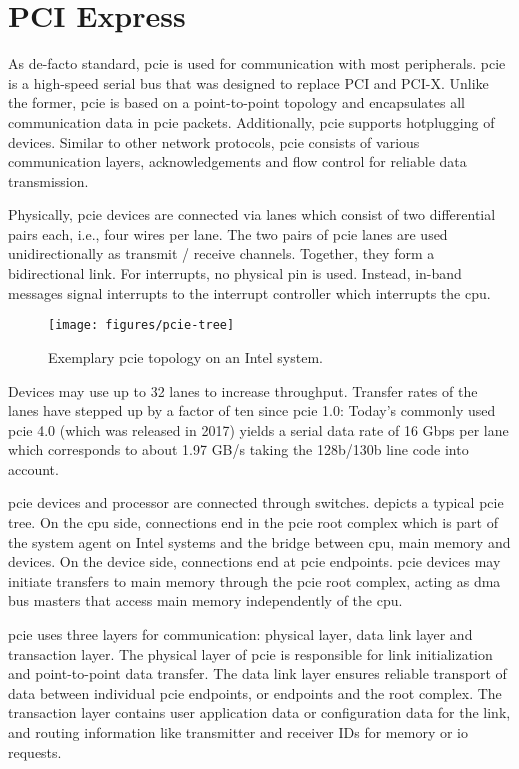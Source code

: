 \section{PCI Express}
\label{sec:pcie}

As de-facto standard, \acf{pcie} is used for communication with most
peripherals. \ac{pcie} is a high-speed serial bus that was designed to replace
PCI and PCI-X. Unlike the former, \ac{pcie} is based on a point-to-point
topology and encapsulates all communication data in \ac{pcie} packets.
Additionally, \ac{pcie} supports hotplugging of devices. Similar to other
network protocols, \ac{pcie} consists of various communication layers,
acknowledgements and flow control for reliable data transmission.

Physically, \ac{pcie} devices are connected via lanes which consist of two
differential pairs each, i.e., four wires per lane. The two pairs of \ac{pcie}
lanes are used unidirectionally as transmit / receive channels. Together, they
form a bidirectional link. For interrupts, no physical pin is used. Instead,
in-band messages signal interrupts to the interrupt controller which interrupts
the \ac{cpu}.

\begin{figure}
    \centering
    \texttt{[image: figures/pcie-tree]}
    \caption{Exemplary \acs{pcie} topology on an Intel system.}
    \label{fig:pcie-topology}
\end{figure}

Devices may use up to 32 lanes to increase throughput. Transfer rates of the
lanes have stepped up by a factor of ten since \ac{pcie} 1.0: Today's commonly
used \ac{pcie} 4.0 (which was released in 2017) yields a serial data rate of 16
Gbps per lane which corresponds to about 1.97 GB/s taking the 128b/130b line
code into account.

\ac{pcie} devices and processor are connected through switches.
 depicts a typical \ac{pcie} tree. On the \ac{cpu} side,
connections end in the \ac{pcie} root complex which is part of the system agent
on Intel systems and the bridge between \ac{cpu}, main memory and devices. On
the device side, connections end at \ac{pcie} endpoints. \ac{pcie} devices may
initiate transfers to main memory through the \ac{pcie} root complex, acting as
\acs{dma} bus masters that access main memory independently of the \ac{cpu}.

\ac{pcie} uses three layers for communication: physical layer, data link layer
and transaction layer. The physical layer of \ac{pcie} is responsible for link
initialization and point-to-point data transfer. The data link layer ensures
reliable transport of data between individual \ac{pcie} endpoints, or endpoints
and the root complex. The transaction layer contains user application data or
configuration data for the link, and routing information like transmitter and
receiver IDs for memory or \ac{io} requests.

